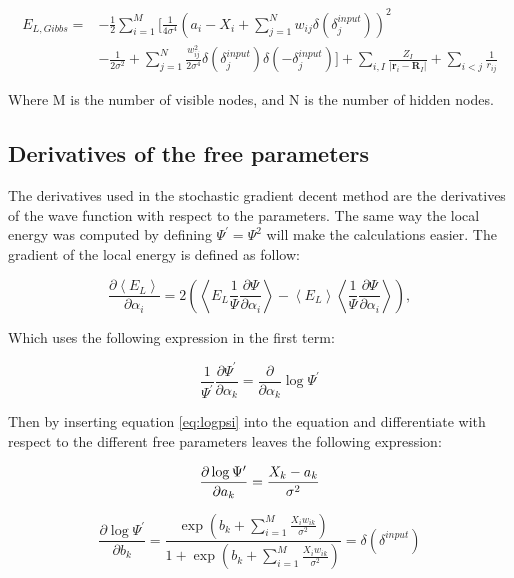 \documentclass[../main.tex]{subfiles}
\begin{document}
\begin{align*}
	E_{L,Gibbs}=& -\frac{1}{2}\sum_{i=1}^M \biggl[\frac{1}{4\sigma^4}\left(     a_i-X_i+\sum_{j=1}^N w_{ij}\delta(\delta_j^{input})\right)^2\\
	& -\frac{1}{2\sigma^2}+\sum_{j=1}^N \frac{w_{ij}^2 }{2\sigma^4}\delta(\delta_j^{input})\delta(-\delta_j^{input} ) \biggr]+\sum_{i, I} \frac{Z_{I}}{\left|\mathbf{r}_{i}-\mathbf{R}_{I}\right|}+\sum_{i<j} \frac{1}{r_{ij}}
\end{align*}

Where M is the number of visible nodes, and N is the number of hidden nodes.

\subsection{Derivatives of the free parameters}
The derivatives used in the stochastic gradient decent method are the derivatives of the wave function with respect to the parameters. The same way the local energy was computed by defining $\Psi^{\prime}=\Psi^2$ will make the calculations easier. The gradient of the local energy is defined as follow:

\begin{equation*}
    \frac{\partial\left\langle E_{L}\right\rangle}{\partial \alpha_{i}}=2\left(\left\langle E_{L} \frac{1}{\Psi} \frac{\partial \Psi}{\partial \alpha_{i}}\right\rangle-\left\langle E_{L}\right\rangle\left\langle\frac{1}{\Psi} \frac{\partial \Psi}{\partial \alpha_{i}}\right\rangle\right),
\end{equation*}

Which uses the following expression in the first term:

\begin{equation}
	\frac{1}{\Psi^{\prime}}\frac{\partial \Psi^{\prime}}{\partial \alpha_k}=\frac{\partial }{\partial \alpha_k}\log \Psi^{\prime}
\end{equation}

Then by inserting equation \eqref{eq:logpsi} into the equation and differentiate with respect to the different free parameters leaves the following expression:

\begin{equation}
	\frac{\partial \log \Psi^{\prime} }{\partial a_k}=\frac{X_k-a_k}{\sigma^2}\\
\end{equation}

\begin{equation}
	    \frac{\partial \log \Psi^{\prime}}{\partial b_k}=\frac{\exp \left(b_k+\sum_{i=1}^M \frac{X_iw_{ik}}{\sigma^2}\right)}{1+\exp \left(b_k+\sum_{i=1}^M \frac{X_iw_{ik}}{\sigma^2}\right)}
	    =\delta(\delta^{input})
\end{equation}
\end{document}
